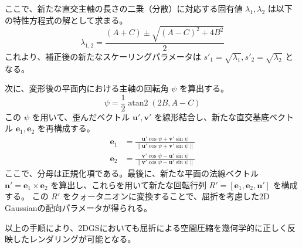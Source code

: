 ここで、新たな直交主軸の長さの二乗（分散）に対応する固有値 $\lambda_{1}, \lambda_{2}$ は以下の特性方程式の解として求まる。
\begin{equation}
  \lambda_{1,2} = \frac{(A+C) \pm \sqrt{(A-C)^2 + 4B^2}}{2}
\end{equation}
これより、補正後の新たなスケーリングパラメータは $s'_1 = \sqrt{\lambda_1}, s'_2 = \sqrt{\lambda_2}$ となる。

次に、変形後の平面内における主軸の回転角 $\psi$ を算出する。
\begin{equation}
  \psi = \frac{1}{2} \operatorname{atan2}\left(2B, A - C\right)
\end{equation}
この $\psi$ を用いて、歪んだベクトル $\mathbf{u}', \mathbf{v}'$ を線形結合し、新たな直交基底ベクトル $\mathbf{e}_1, \mathbf{e}_2$ を再構成する。
\begin{equation}
\begin{split}
  \mathbf{e}_1 &= \frac{\mathbf{u}' \cos \psi + \mathbf{v}' \sin \psi}{\|\mathbf{u}' \cos \psi + \mathbf{v}' \sin \psi\|} \\
  \mathbf{e}_2 &= \frac{\mathbf{v}' \cos \psi - \mathbf{u}' \sin \psi}{\|\mathbf{v}' \cos \psi - \mathbf{u}' \sin \psi\|}
\end{split}
\end{equation}
ここで、分母は正規化項である。最後に、新たな平面の法線ベクトル $\mathbf{n}' = \mathbf{e}_1 \times \mathbf{e}_2$ を算出し、これらを用いて新たな回転行列 $R' = [\mathbf{e}_1, \mathbf{e}_2, \mathbf{n}']$ を構成する。
この $R'$ をクォータニオンに変換することで、屈折を考慮した2D Gaussianの配向パラメータが得られる。

以上の手順により、2DGSにおいても屈折による空間圧縮を幾何学的に正しく反映したレンダリングが可能となる。


